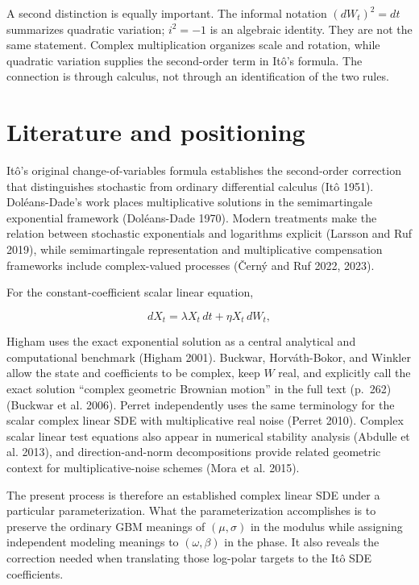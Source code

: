 \documentclass[
  english,
  10pt,
  letterpaper,
  DIV=11,
  numbers=noendperiod]{scrartcl}
\begin{document}
A second distinction is equally important. The informal notation
\((dW_t)^2=dt\) summarizes quadratic variation; \(i^2=-1\) is an
algebraic identity. They are not the same statement. Complex
multiplication organizes scale and rotation, while quadratic variation
supplies the second-order term in Itô's formula. The connection is
through calculus, not through an identification of the two rules.

\section{Literature and positioning}\label{sec-literature}

Itô's original change-of-variables formula establishes the second-order
correction that distinguishes stochastic from ordinary differential
calculus (Itô 1951). Doléans-Dade's work places multiplicative solutions
in the semimartingale exponential framework (Doléans-Dade 1970). Modern
treatments make the relation between stochastic exponentials and
logarithms explicit (Larsson and Ruf 2019), while semimartingale
representation and multiplicative compensation frameworks include
complex-valued processes (Černý and Ruf 2022, 2023).

For the constant-coefficient scalar linear equation,

\[
dX_t=\lambda X_t\,dt+\eta X_t\,dW_t,
\]

Higham uses the exact exponential solution as a central analytical and
computational benchmark (Higham 2001). Buckwar, Horváth-Bokor, and
Winkler allow the state and coefficients to be complex, keep \(W\) real,
and explicitly call the exact solution ``complex geometric Brownian
motion'' in the full text (p.~262) (Buckwar et al. 2006). Perret
independently uses the same terminology for the scalar complex linear
SDE with multiplicative real noise (Perret 2010). Complex scalar linear
test equations also appear in numerical stability analysis (Abdulle et
al. 2013), and direction-and-norm decompositions provide related
geometric context for multiplicative-noise schemes (Mora et al. 2015).

The present process is therefore an established complex linear SDE under
a particular parameterization. What the parameterization accomplishes is
to preserve the ordinary GBM meanings of \((\mu,\sigma)\) in the modulus
while assigning independent modeling meanings to \((\omega,\beta)\) in
the phase. It also reveals the correction needed when translating those
log-polar targets to the Itô SDE coefficients.
\end{document}
